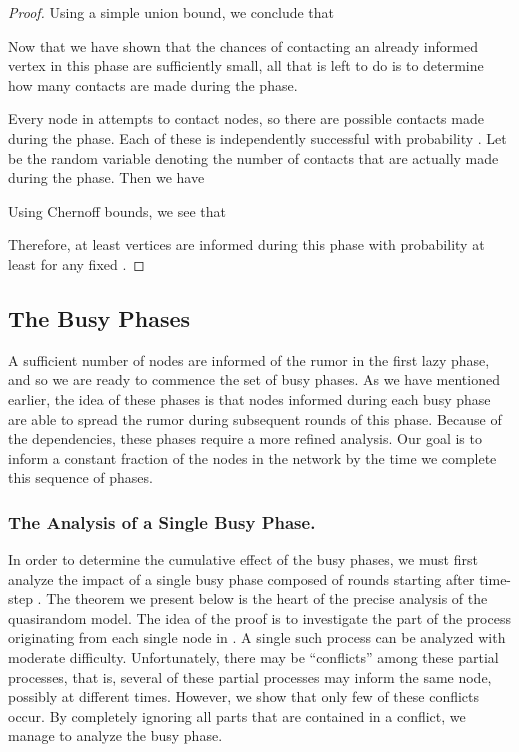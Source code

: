 \documentclass[12pt]{article}
\begin{document}
{\begin{proof}
Using a simple union bound, we conclude that



Now that we have shown that the chances of contacting an already informed vertex in this phase are sufficiently small, all that is left to do is to determine how many contacts are made during the phase.


Every node in  attempts to contact  nodes, so there are  possible contacts made during the phase. Each of these is independently successful with probability . Let  be the random variable denoting the number of contacts that are actually made during the phase. Then we have

Using Chernoff bounds, we see that




Therefore, at least  vertices are informed during this phase with probability at least  for any fixed .
\end{proof}




\subsection{The Busy Phases}
A sufficient number of nodes are informed of the rumor in the first lazy phase, and so we are ready to commence the set of busy phases. As we have mentioned earlier, the idea of these phases is that
nodes informed during each busy phase are able to spread the rumor during subsequent rounds of this phase. Because of the dependencies, these phases require a more refined analysis. Our goal is to inform a constant fraction of the nodes in the network by the time we complete this sequence of phases.

\subsubsection{The Analysis of a Single Busy Phase.}
In order to determine the cumulative effect of the busy phases, we must first analyze the impact of a single busy phase composed of  rounds starting after time-step . The theorem we present below is the heart of the precise analysis of the quasirandom model. The idea of the proof is to investigate the part of the process originating from each single node in . A single such process can be analyzed with moderate difficulty. Unfortunately, there may be  ``conflicts'' among these partial processes, that is, several of these partial processes may inform the same node, possibly at different times. However, we show that only few of these conflicts occur. By completely ignoring all parts that are contained in a conflict, we manage to analyze the busy phase.

}
\end{document}
